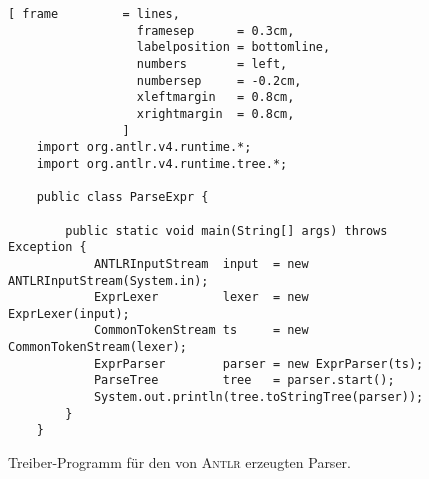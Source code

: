 \begin{figure}[!ht]
\centering
\begin{Verbatim}[ frame         = lines, 
                  framesep      = 0.3cm, 
                  labelposition = bottomline,
                  numbers       = left,
                  numbersep     = -0.2cm,
                  xleftmargin   = 0.8cm,
                  xrightmargin  = 0.8cm,
                ]
    import org.antlr.v4.runtime.*;
    import org.antlr.v4.runtime.tree.*;
    
    public class ParseExpr {
    
        public static void main(String[] args) throws Exception {
            ANTLRInputStream  input  = new ANTLRInputStream(System.in);
            ExprLexer         lexer  = new ExprLexer(input);
            CommonTokenStream ts     = new CommonTokenStream(lexer);
            ExprParser        parser = new ExprParser(ts);
            ParseTree         tree   = parser.start();
            System.out.println(tree.toStringTree(parser)); 
        }
    }
\end{Verbatim}
\vspace*{-0.3cm}
\caption{Treiber-Programm f\"ur den von \textsc{Antlr} erzeugten Parser.}
\label{fig:ParseExpr.java}
\end{figure}

